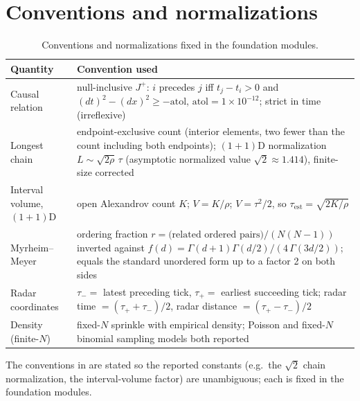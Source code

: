 \section{Conventions and normalizations}\label{app:conventions}

\begin{table}[!htb]
\caption{Conventions and normalizations fixed in the foundation modules.}
\label{tab:conventions}
\small
\begin{tabular}{@{}>{\raggedright\arraybackslash}p{7pc}>{\raggedright\arraybackslash}p{27pc}@{}}
\toprule
Quantity & Convention used \\
\midrule
Causal relation & null-inclusive $J^+$: $i$ precedes $j$ iff
  $t_j - t_i > 0$ and $(dt)^2 - (dx)^2 \ge -\mathrm{atol}$,
  $\mathrm{atol} = 1\times10^{-12}$; strict in time (irreflexive) \\
Longest chain & endpoint-exclusive count (interior elements, two fewer
  than the count including both endpoints); $(1{+}1)$D normalization
  $L \sim \sqrt{2\rho}\,\tau$ (asymptotic normalized value
  $\sqrt{2} \approx 1.414$), finite-size corrected \\
Interval volume, $(1{+}1)$D & open Alexandrov count $K$; $V = K/\rho$;
  $V = \tau^2/2$, so $\tau_{\mathrm{est}} = \sqrt{2K/\rho}$ \\
Myrheim--Meyer & ordering fraction
  $r = \mbox{(related ordered pairs)}/(N(N-1))$ inverted against
  $f(d) = \Gamma(d+1)\Gamma(d/2)/(4\,\Gamma(3d/2))$; equals the standard
  unordered form up to a factor 2 on both sides \\
Radar coordinates & $\tau_- =$ latest preceding tick, $\tau_+ =$
  earliest succeeding tick; radar time $= (\tau_+ + \tau_-)/2$, radar
  distance $= (\tau_+ - \tau_-)/2$ \\
Density (finite-$N$) & fixed-$N$ sprinkle with empirical density;
  Poisson and fixed-$N$ binomial sampling models both reported \\
\bottomrule
\end{tabular}
\end{table}

The conventions in  are stated so the reported
constants (e.g.\ the $\sqrt{2}$ chain normalization, the interval-volume
factor) are unambiguous; each is fixed in the foundation modules.
